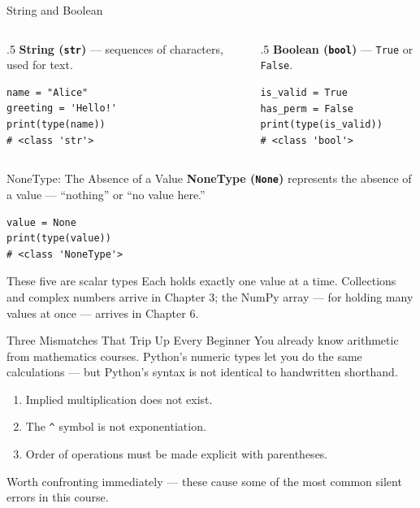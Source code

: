 \documentclass[9pt,aspectratio=169,xcolor=table]{beamer}
\begin{document}
\begin{frame}[fragile]{String and Boolean}
    \leavevmode
    \begin{columns}[t]
        \begin{column}{.5\textwidth}
            \textbf{String (\texttt{str})} --- sequences of characters,
            used for text.
\begin{lstlisting}
name = "Alice"
greeting = 'Hello!'
print(type(name))
# <class 'str'>
\end{lstlisting}
        \end{column}
        \begin{column}{.5\textwidth}
            \textbf{Boolean (\texttt{bool})} --- \texttt{True} or
            \texttt{False}.
\begin{lstlisting}
is_valid = True
has_perm = False
print(type(is_valid))
# <class 'bool'>
\end{lstlisting}
        \end{column}
    \end{columns}
\end{frame}

\begin{frame}[fragile]{NoneType: The Absence of a Value}
    \leavevmode
    \textbf{NoneType (\texttt{None})} represents the absence of a value
    --- ``nothing'' or ``no value here.''

\begin{lstlisting}
value = None
print(type(value))
# <class 'NoneType'>
\end{lstlisting}

    \vspace{3mm}
    \begin{block}{These five are \alert{scalar} types}
        \small Each holds exactly one value at a time. Collections and
        complex numbers arrive in Chapter 3; the NumPy array --- for
        holding many values at once --- arrives in Chapter 6.
    \end{block}
\end{frame}

\begin{frame}{Three Mismatches That Trip Up Every Beginner}
    \leavevmode
    You already know arithmetic from mathematics courses. Python's
    numeric types let you do the same calculations --- but Python's
    \alert{syntax} is not identical to handwritten shorthand.

    \vspace{3mm}
    \begin{enumerate}
        \item Implied multiplication does not exist.
        \item The \texttt{\^{}} symbol is not exponentiation.
        \item Order of operations must be made explicit with parentheses.
    \end{enumerate}

    \vspace{3mm}
    {\small Worth confronting immediately --- these cause some of the
    most common silent errors in this course.}
\end{frame}
\end{document}

